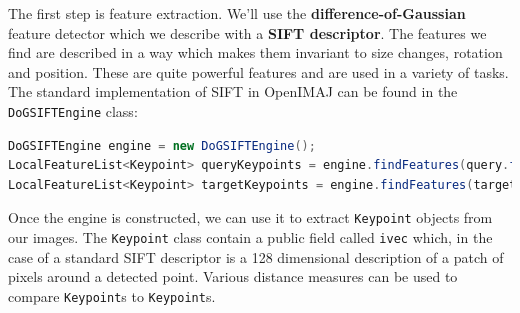 The first step is feature extraction. We'll use the \textbf{difference-of-Gaussian} feature detector 
which we describe with a \textbf{SIFT descriptor}. The features we find are described in a way which 
makes them invariant to size changes, rotation and position. These are quite powerful features and 
are used in a variety of tasks. The standard implementation of SIFT in OpenIMAJ can be found in the 
\verb+DoGSIFTEngine+ class:
\begin{lstlisting}[language=java]
DoGSIFTEngine engine = new DoGSIFTEngine();	
LocalFeatureList<Keypoint> queryKeypoints = engine.findFeatures(query.flatten());
LocalFeatureList<Keypoint> targetKeypoints = engine.findFeatures(target.flatten());
\end{lstlisting}
Once the engine is constructed, we can use it to extract \verb+Keypoint+ objects from our images. 
The \verb+Keypoint+ class contain a public field called \verb+ivec+ which, in the case
of a standard SIFT descriptor is a 128 dimensional description of a patch of pixels around a 
detected point. Various distance measures can be used to compare \verb+Keypoint+s to \verb+Keypoint+s.

